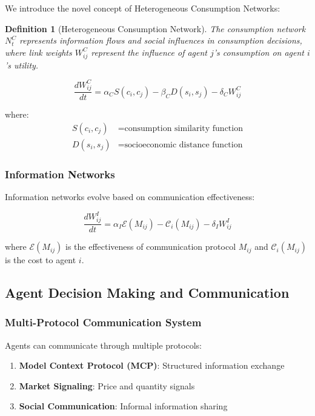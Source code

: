 \documentclass[12pt,a4paper]{article}
\newtheorem{definition}[theorem]{Definition}
\begin{document}
We introduce the novel concept of Heterogeneous Consumption Networks:

\begin{definition}[Heterogeneous Consumption Network]
The consumption network $N_t^C$ represents information flows and social influences in consumption decisions, where link weights $W_{ij}^C$ represent the influence of agent $j$'s consumption on agent $i$'s utility.
\end{definition}

\begin{equation}
\frac{dW_{ij}^C}{dt} = \alpha_C S(c_i, c_j) - \beta_C D(s_i, s_j) - \delta_C W_{ij}^C
\end{equation}

where:
\begin{align}
S(c_i, c_j) &= \text{consumption similarity function} \\
D(s_i, s_j) &= \text{socioeconomic distance function}
\end{align}

\subsubsection{Information Networks}

Information networks evolve based on communication effectiveness:

\begin{equation}
\frac{dW_{ij}^I}{dt} = \alpha_I \mathcal{E}(M_{ij}) - \mathcal{C}_i(M_{ij}) - \delta_I W_{ij}^I
\end{equation}

where $\mathcal{E}(M_{ij})$ is the effectiveness of communication protocol $M_{ij}$ and $\mathcal{C}_i(M_{ij})$ is the cost to agent $i$.

\subsection{Agent Decision Making and Communication}

\subsubsection{Multi-Protocol Communication System}

Agents can communicate through multiple protocols:

\begin{enumerate}
\item \textbf{Model Context Protocol (MCP)}: Structured information exchange
\item \textbf{Market Signaling}: Price and quantity signals
\item \textbf{Social Communication}: Informal information sharing
\end{enumerate}
\end{document}

